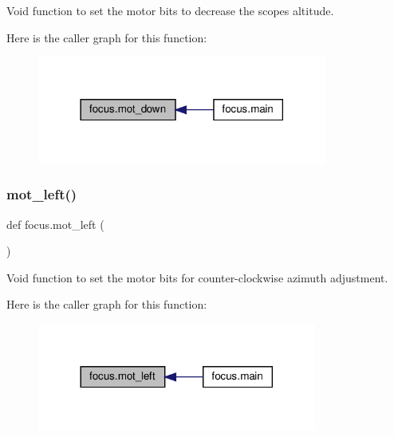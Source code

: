 Void function to set the motor bits to decrease the scope\textquotesingle{}s altitude. 

Here is the caller graph for this function\+:\nopagebreak
\begin{figure}[H]
\begin{center}
\leavevmode
\includegraphics[width=270pt]{namespacefocus_ab92c9c6869b0af6ce3a5920ef8554190_icgraph}
\end{center}
\end{figure}
\mbox{\label{namespacefocus_ace370021c60f38a82ce96e69a482cbe3}} 
\subsubsection{\texorpdfstring{mot\+\_\+left()}{mot\_left()}}
{\footnotesize\ttfamily def focus.\+mot\+\_\+left (\begin{DoxyParamCaption}{ }\end{DoxyParamCaption})}



Void function to set the motor bits for counter-\/clockwise azimuth adjustment. 

Here is the caller graph for this function\+:\nopagebreak
\begin{figure}[H]
\begin{center}
\leavevmode
\includegraphics[width=260pt]{namespacefocus_ace370021c60f38a82ce96e69a482cbe3_icgraph}
\end{center}
\end{figure}
\mbox{\label{namespacefocus_a9939d6f9388d8eb82625bd8e3af6f894}} 
